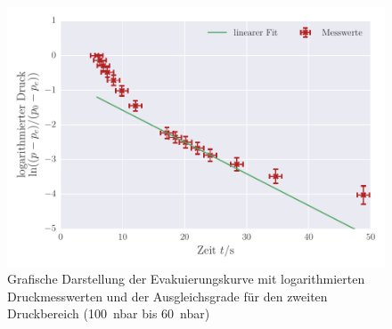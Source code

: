 \begin{figure}[!h]
 \centering
 \includegraphics[scale=0.9]{../Grafiken/Evakuierungskurve_Turbo_log_1.pdf}
 \caption{Grafische Darstellung der Evakuierungskurve mit logarithmierten Druckmesswerten und der Ausgleichsgrade für den zweiten Druckbereich (\SI{100}{\nano\bar} bis \SI{60}{\nano\bar})\label{fig:evakuierungskurve_turbo_log_1}}
 \end{figure} 